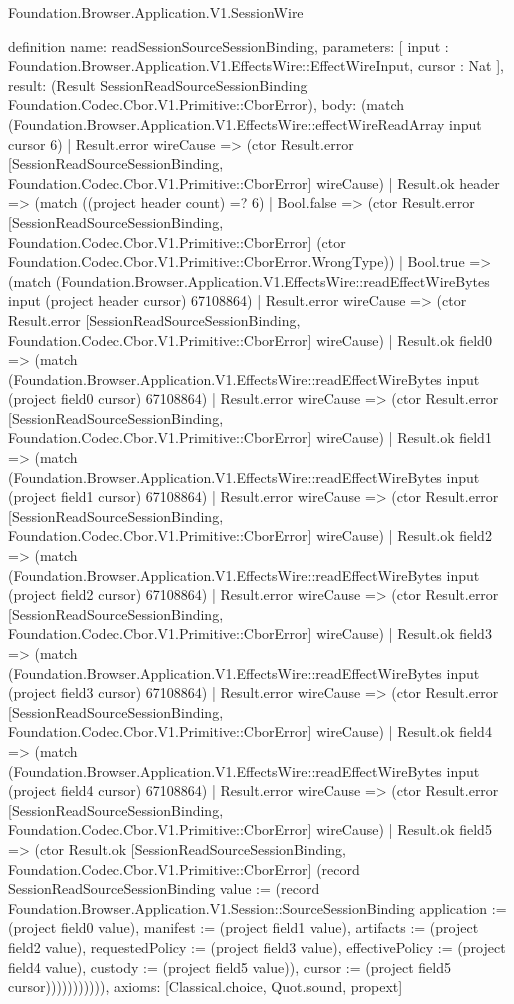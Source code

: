 \begin{lexlean}{Foundation.Browser.Application.V1.SessionWire}
\begin{semanticmodule}
definition{
  name: readSessionSourceSessionBinding,
  parameters: [
    input : Foundation.Browser.Application.V1.EffectsWire::EffectWireInput,
    cursor : Nat
  ],
  result: (Result SessionReadSourceSessionBinding Foundation.Codec.Cbor.V1.Primitive::CborError),
  body: (match (Foundation.Browser.Application.V1.EffectsWire::effectWireReadArray input cursor 6)
    | Result.error wireCause => (ctor Result.error [SessionReadSourceSessionBinding, Foundation.Codec.Cbor.V1.Primitive::CborError] wireCause)
    | Result.ok header => (match ((project header count) =? 6)
      | Bool.false => (ctor Result.error [SessionReadSourceSessionBinding, Foundation.Codec.Cbor.V1.Primitive::CborError] (ctor Foundation.Codec.Cbor.V1.Primitive::CborError.WrongType))
      | Bool.true => (match (Foundation.Browser.Application.V1.EffectsWire::readEffectWireBytes input (project header cursor) 67108864)
        | Result.error wireCause => (ctor Result.error [SessionReadSourceSessionBinding, Foundation.Codec.Cbor.V1.Primitive::CborError] wireCause)
        | Result.ok field0 => (match (Foundation.Browser.Application.V1.EffectsWire::readEffectWireBytes input (project field0 cursor) 67108864)
          | Result.error wireCause => (ctor Result.error [SessionReadSourceSessionBinding, Foundation.Codec.Cbor.V1.Primitive::CborError] wireCause)
          | Result.ok field1 => (match (Foundation.Browser.Application.V1.EffectsWire::readEffectWireBytes input (project field1 cursor) 67108864)
            | Result.error wireCause => (ctor Result.error [SessionReadSourceSessionBinding, Foundation.Codec.Cbor.V1.Primitive::CborError] wireCause)
            | Result.ok field2 => (match (Foundation.Browser.Application.V1.EffectsWire::readEffectWireBytes input (project field2 cursor) 67108864)
              | Result.error wireCause => (ctor Result.error [SessionReadSourceSessionBinding, Foundation.Codec.Cbor.V1.Primitive::CborError] wireCause)
              | Result.ok field3 => (match (Foundation.Browser.Application.V1.EffectsWire::readEffectWireBytes input (project field3 cursor) 67108864)
                | Result.error wireCause => (ctor Result.error [SessionReadSourceSessionBinding, Foundation.Codec.Cbor.V1.Primitive::CborError] wireCause)
                | Result.ok field4 => (match (Foundation.Browser.Application.V1.EffectsWire::readEffectWireBytes input (project field4 cursor) 67108864)
                  | Result.error wireCause => (ctor Result.error [SessionReadSourceSessionBinding, Foundation.Codec.Cbor.V1.Primitive::CborError] wireCause)
                  | Result.ok field5 => (ctor Result.ok [SessionReadSourceSessionBinding, Foundation.Codec.Cbor.V1.Primitive::CborError] (record SessionReadSourceSessionBinding {value := (record Foundation.Browser.Application.V1.Session::SourceSessionBinding {application := (project field0 value), manifest := (project field1 value), artifacts := (project field2 value), requestedPolicy := (project field3 value), effectivePolicy := (project field4 value), custody := (project field5 value)}), cursor := (project field5 cursor)})))))))))),
  axioms: [Classical.choice, Quot.sound, propext]
}


\end{semanticmodule}
\end{lexlean}
